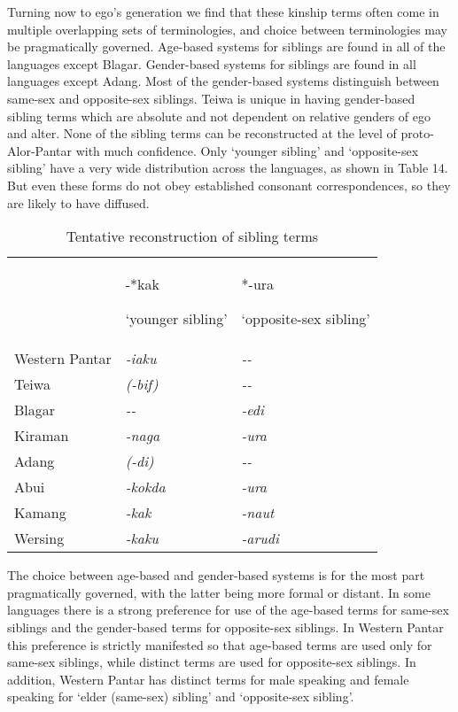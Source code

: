 Turning now to ego's generation we find that these kinship terms often come in multiple overlapping sets of terminologies, and choice between terminologies may be pragmatically governed. Age-based systems for siblings are found in all of the languages except Blagar. Gender-based systems for siblings are found in all languages except Adang. Most of the gender-based systems distinguish between same-sex and opposite-sex siblings. Teiwa is unique in having gender-based sibling terms which are absolute and not dependent on relative genders of ego and alter. None of the sibling terms can be reconstructed at the level of proto-Alor-Pantar with much confidence. Only `younger sibling' and `opposite-sex sibling' have a very wide distribution across the languages, as shown in Table 14. But even these forms do not obey established consonant correspondences, so they are likely to have diffused.



\begin{table}\centering
\begin{tabular}{lll} & {}-*kak\par
 `younger sibling'\par & *-ura\par
 `opposite-sex sibling'\par\\
Western Pantar & \textit{{}-iaku} & \textit{{}-{}-}\\
Teiwa & \textit{(-bif)} & \textit{{}-{}-}\\
Blagar & \textit{{}-{}-} & \textit{{}-edi}\\
Kiraman & \textit{{}-naga} & \textit{{}-ura}\\
Adang & \textit{(-di)} & \textit{{}-{}-}\\
Abui & \textit{{}-kokda} & \textit{{}-ura}\\
Kamang & \textit{{}-kak} & \textit{{}-naut}\\
Wersing & \textit{{}-kaku} & \textit{{}-arudi}\\
\end{tabular}

\caption{Tentative reconstruction of sibling terms }
\end{table}
\clearpage

The choice between age-based and gender-based systems is for the most part pragmatically governed, with the latter being more formal or distant. In some languages there is a strong preference for use of the age-based terms for same-sex siblings and the gender-based terms for opposite-sex siblings. In Western Pantar this preference is strictly manifested so that age-based terms are used only for same-sex siblings, while distinct terms are used for opposite-sex siblings. In addition, Western Pantar has distinct terms for male speaking and female speaking for `elder (same-sex) sibling' and `opposite-sex sibling'.

